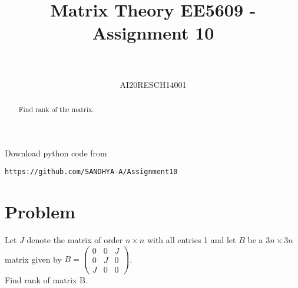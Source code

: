 \documentclass[journal,12pt,twocolumn]{IEEEtran}
\numberwithin{equation}{subsection}
\begin{document}
\title{Matrix Theory EE5609 - Assignment 10\\
}

\author{\\
 \\
AI20RESCH14001\\
 }

\maketitle
\begin{abstract}
Find rank of the matrix.
\end{abstract}
Download  python code from 
\begin{lstlisting}
https://github.com/SANDHYA-A/Assignment10
\end{lstlisting}
\section{Problem}
Let $J$ denote the matrix of order $n \times n$ with all
entries 1 and let $B$ be a $3n \times 3n$ matrix given by
$B = \begin{pmatrix}0&0&J\\0&J&0\\J&0&0\end{pmatrix}$. \\
Find rank of matrix B.
\end{document}
